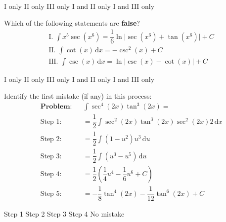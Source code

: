\begin{questions}
    \begin{oneparchoices}
        \choice I only 
        \choice II only
        \choice III only 
        \choice I and II only
        \choice I and III only
    \end{oneparchoices} \par \horizontalline

    \question Which of the following statements are \textbf{false}? \begin{align*}
        & \text{I. } \int x^5\sec \left(x^6\right) = \dfrac{1}{6}\ln \bigg|\sec \left(x^6\right) + \tan \left(x^6\right)\bigg| + C \\[11pt]
        & \text{II. } \int \cot (x) \,\mathrm{d}x = -\csc^2 (x) + C \\[11pt]
        & \text{III. } \int \csc (x) \,\mathrm{d}x = \ln |\csc (x) - \cot (x)| + C
    \end{align*}

    \begin{oneparchoices}
        \choice I only 
        \choice II only
        \choice III only 
        \choice I and II only
        \choice I and III only
    \end{oneparchoices} \par \horizontalline

    \question Identify the first mistake (if any) in this process: \begin{align*}
        & \textbf{Problem:} && \int \sec^4 (2x)\tan^3 (2x) = \\[11pt]
        & \text{Step 1:} && = \dfrac{1}{2}\int \sec^2 (2x)\tan^3 (2x)\sec^2 (2x)2 \,\mathrm{d}x \\[5.5pt]
        & \text{Step 2:} && = \dfrac{1}{2}\int \left(1 - u^2\right)u^3 \,\mathrm{d}u \\[5.5pt]
        & \text{Step 3:} && = \dfrac{1}{2}\int \left(u^3 - u^5\right) \,\mathrm{d}u \\[5.5pt]
        & \text{Step 4:} && = \dfrac{1}{2}\left(\dfrac{1}{4}u^4 - \dfrac{1}{6}u^6 + C\right) \\[5.5pt]
        & \text{Step 5:} && = -\dfrac{1}{8}\tan^4 (2x) - \dfrac{1}{12}\tan^6 (2x) + C
    \end{align*}

    \begin{oneparchoices}
        \choice Step 1
        \choice Step 2
        \choice Step 3
        \choice Step 4
        \choice No mistake
    \end{oneparchoices} \par \horizontalline
\end{questions}
